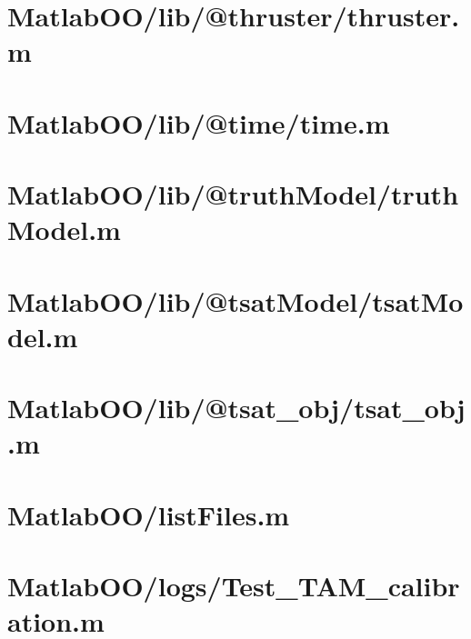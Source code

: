 \pagebreak
\section{MatlabOO/lib/@thruster/thruster.m}\label{code:MatlabOO/lib/@thruster/thruster.m}


\pagebreak
\section{MatlabOO/lib/@time/time.m}\label{code:MatlabOO/lib/@time/time.m}


\pagebreak
\section{MatlabOO/lib/@truthModel/truthModel.m}\label{code:MatlabOO/lib/@truthModel/truthModel.m}


\pagebreak
\section{MatlabOO/lib/@tsatModel/tsatModel.m}\label{code:MatlabOO/lib/@tsatModel/tsatModel.m}


\pagebreak
\section{MatlabOO/lib/@tsat\_obj/tsat\_obj.m}\label{code:MatlabOO/lib/@tsat_obj/tsat_obj.m}


\pagebreak
\section{MatlabOO/listFiles.m}\label{code:MatlabOO/listFiles.m}


\pagebreak
\section{MatlabOO/logs/Test\_TAM\_calibration.m}\label{code:MatlabOO/logs/Test_TAM_calibration.m}


